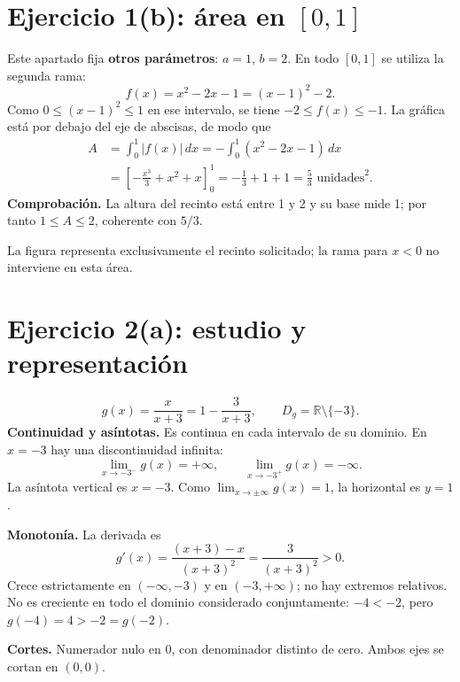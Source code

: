 \documentclass[11pt]{article}
\begin{document}
\section*{Ejercicio 1(b): área en $[0,1]$}
Este apartado fija \textbf{otros parámetros}: $a=1$, $b=2$. En todo $[0,1]$ se utiliza la segunda rama:
\[f(x)=x^2-2x-1=(x-1)^2-2.\]
Como $0\leq(x-1)^2\leq1$ en ese intervalo, se tiene $-2\leq f(x)\leq-1$. La gráfica está por debajo del eje de abscisas, de modo que
\begin{align*}
A&=\int_0^1|f(x)|\,dx=-\int_0^1(x^2-2x-1)\,dx\\
&=\left[-\frac{x^3}{3}+x^2+x\right]_0^1
=-\frac13+1+1=\boxed{\frac53\text{ unidades}^2}.
\end{align*}
\textbf{Comprobación.} La altura del recinto está entre 1 y 2 y su base mide 1; por tanto $1\leq A\leq2$, coherente con $5/3$.
\begin{center}
\end{center}
La figura representa exclusivamente el recinto solicitado; la rama para $x<0$ no interviene en esta área.
\clearpage
\section*{Ejercicio 2(a): estudio y representación}
\[g(x)=\frac{x}{x+3}=1-\frac{3}{x+3},\qquad D_g=\mathbb R\setminus\{-3\}.\]
\textbf{Continuidad y asíntotas.} Es continua en cada intervalo de su dominio. En $x=-3$ hay una discontinuidad infinita:
\[\lim_{x\to-3^-}g(x)=+\infty,\qquad\lim_{x\to-3^+}g(x)=-\infty.\]
La asíntota vertical es $x=-3$. Como $\lim_{x\to\pm\infty}g(x)=1$, la horizontal es $y=1$.

\textbf{Monotonía.} La derivada es
\[g'(x)=\frac{(x+3)-x}{(x+3)^2}=\frac{3}{(x+3)^2}>0.\]
Crece estrictamente en $(-\infty,-3)$ y en $(-3,+\infty)$; no hay extremos relativos. No es creciente en todo el dominio considerado conjuntamente: $-4<-2$, pero $g(-4)=4>-2=g(-2)$.

\textbf{Cortes.} Numerador nulo en $0$, con denominador distinto de cero. Ambos ejes se cortan en $(0,0)$.
\end{document}
